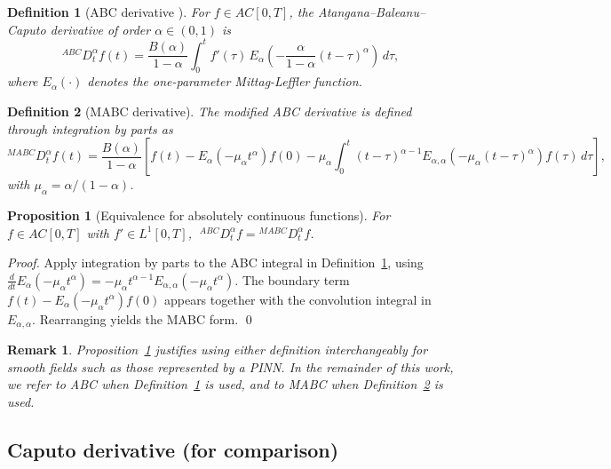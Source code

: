 \documentclass[11pt]{article}
\newtheorem{proposition}{Proposition}
\newtheorem{definition}{Definition}
\newtheorem{remark}{Remark}
\begin{document}
\begin{definition}[ABC derivative \cite{Atangana2016}]
\label{def:abc}
For \(f \in AC[0,T]\), the Atangana--Baleanu--Caputo derivative of order \(\alpha \in (0,1)\) is
\begin{equation}
{}^{ABC}D_t^\alpha f(t)
=
\frac{B(\alpha)}{1-\alpha}
\int_0^t
f'(\tau)\,
E_\alpha\!\left(-\frac{\alpha}{1-\alpha}(t-\tau)^\alpha\right)
\,d\tau,
\end{equation}
where \(E_\alpha(\cdot)\) denotes the one-parameter Mittag-Leffler function.
\end{definition}

\begin{definition}[MABC derivative]
\label{def:mabc}
The modified ABC derivative is defined through integration by parts as
\begin{equation}
{}^{MABC}D_t^\alpha f(t)
=
\frac{B(\alpha)}{1-\alpha}
\!\left[
f(t) - E_\alpha(-\mu_\alpha t^\alpha) f(0)
- \mu_\alpha \!\int_0^t\! (t-\tau)^{\alpha-1} E_{\alpha,\alpha}(-\mu_\alpha(t-\tau)^\alpha) f(\tau)\,d\tau
\right],
\end{equation}
with \(\mu_\alpha = \alpha/(1-\alpha)\).
\end{definition}

\begin{proposition}[Equivalence for absolutely continuous functions]
\label{prop:equiv}
For \(f \in AC[0,T]\) with \(f' \in L^1[0,T]\), \(\;{}^{ABC}D_t^\alpha f = {}^{MABC}D_t^\alpha f\).
\end{proposition}

\begin{proof}
Apply integration by parts to the ABC integral in Definition~\ref{def:abc}, using
\(\frac{d}{dt}E_\alpha(-\mu_\alpha t^\alpha) = -\mu_\alpha t^{\alpha-1} E_{\alpha,\alpha}(-\mu_\alpha t^\alpha)\).
The boundary term \(f(t) - E_\alpha(-\mu_\alpha t^\alpha) f(0)\) appears together with the convolution integral in \(E_{\alpha,\alpha}\). Rearranging yields the MABC form. \qed
\end{proof}

\begin{remark}
Proposition~\ref{prop:equiv} justifies using either definition interchangeably for smooth fields such as those represented by a PINN. In the remainder of this work, we refer to \emph{ABC} when Definition~\ref{def:abc} is used, and to \emph{MABC} when Definition~\ref{def:mabc} is used.
\end{remark}

\subsection{Caputo derivative (for comparison)}
\label{sec:caputo}
\end{document}
